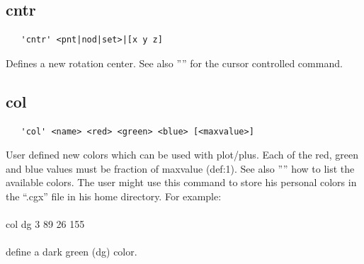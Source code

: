 \documentclass{article}
\begin{document}
\subsection{\label{cntr}cntr}
\begin{verbatim}
   'cntr' <pnt|nod|set>|[x y z]
\end{verbatim}
Defines a new rotation center. See also '''' for the cursor controlled command.

\subsection{\label{col}col}
\begin{verbatim}
   'col' <name> <red> <green> <blue> [<maxvalue>]
\end{verbatim}
User defined new colors which can be used with plot/plus. Each of the red, green and blue values must be fraction of maxvalue (def:1). See also '''' how to list the available colors. The user might use this command to store his personal colors in the ``.cgx'' file in his home directory. For example:\\\\
col dg 3 89 26 155\\\\define a dark green (dg) color.
\end{document}
